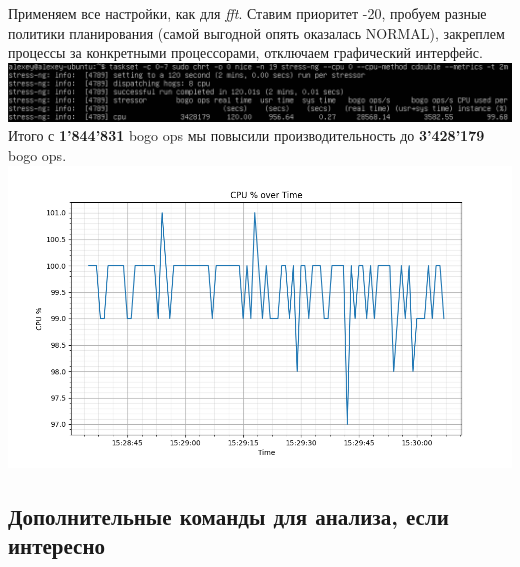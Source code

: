Применяем все настройки, как для \textit{fft}. Ставим приоритет -20, пробуем разные политики планирования (самой выгодной опять оказалась NORMAL), закреплем процессы за конкретными процессорами, отключаем графический интерфейс.\\
\includegraphics[width=\textwidth]{image/cpu-cdouble-max.png}
Итого с \textbf{1'844'831} bogo ops мы повысили производительность до \textbf{3'428'179} bogo ops.\\
\includegraphics[width=\textwidth]{image/cpu_usage_max.png}

\subsection{Дополнительные команды для анализа, если интересно}
